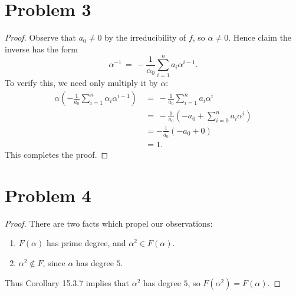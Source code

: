 \documentclass[11pt]{article}
\begin{document}

\section{Problem 3}

\begin{proof}
  Observe that $a_{0} \ne 0$ by the irreducibility of $f$, so $\alpha \ne 0$. Hence claim the inverse has the form
  \[
    \boxed{\alpha^{-1} \, = \, -\frac{1}{\alpha_{0}}\sum\limits_{i = 1}^{n} a_{i} \alpha^{i - 1}}.
  \]
  To verify this, we need only multiply it by $\alpha$:
  \begin{align*}
    \alpha \left( - \frac{1}{a_{0}}\sum\limits_{i = 1}^{n} \alpha_{i} \alpha^{i - 1} \right) \, &= \, - \frac{1}{a_{0}} \sum\limits_{i = 1}^{n} a_{i} \alpha^{i} \\
                                                                                                &= \, - \frac{1}{a_{0}} \left( - a_{0}  + \sum\limits_{i = 0}^{n} a_{i} \alpha^{i} \right) \\
                                                                                                &= -\frac{1}{a_{0}} \left( -a_{0} + 0 \right) \\
                                                                                                &= 1.
  \end{align*}
  This completes the proof.
\end{proof}


\section{Problem 4}

\begin{proof}
  There are two facts which propel our observations:
  \begin{enumerate}
    \item $F(\alpha)$ has prime degree, and $\alpha^{2} \in F(\alpha)$.
    \item $\alpha^{2} \notin F$, since $\alpha$ has degree $5$.
  \end{enumerate}
  Thus Corollary 15.3.7 implies that $\alpha^{2}$ has degree $5$, so $F(\alpha^{2}) = F(\alpha)$.
\end{proof}


\end{document}
